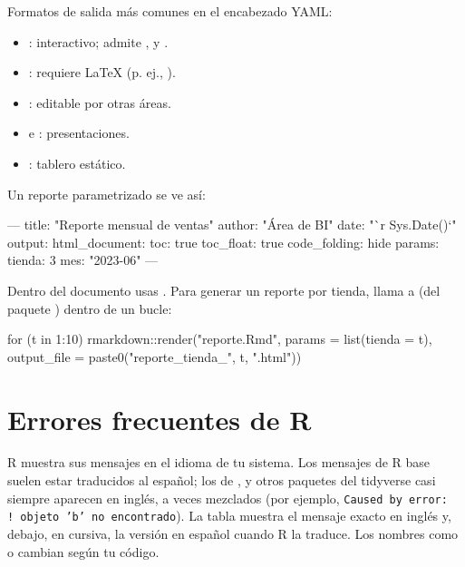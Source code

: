 Formatos de salida más comunes en el encabezado YAML:
\begin{itemize}
\item {}: interactivo; admite ,
   y .
\item {}: requiere LaTeX (p. ej., ).
\item {}: editable por otras áreas.
\item {} e :
  presentaciones.
\item {}: tablero estático.
\end{itemize}
Un reporte parametrizado se ve así:

\begin{textocodigo}[title={Encabezado YAML de un reporte parametrizado}]
---
title: "Reporte mensual de ventas"
author: "Área de BI"
date: "`r Sys.Date()`"
output:
  html_document:
    toc: true
    toc_float: true
    code_folding: hide
params:
  tienda: 3
  mes: "2023-06"
---
\end{textocodigo}

Dentro del documento usas . Para generar un
reporte por tienda, llama a  (del paquete
) dentro de un bucle:

\begin{rnoejecutar}[title={Un reporte por tienda}]
for (t in 1:10) {
  rmarkdown::render("reporte.Rmd", params = list(tienda = t),
                    output_file = paste0("reporte_tienda_", t, ".html"))
}
\end{rnoejecutar}

\section{Errores frecuentes de R}
\label{sec:ap-b-errores}

R muestra sus mensajes en el idioma de tu sistema. Los mensajes de R base
suelen estar traducidos al español; los de ,
 y otros paquetes del tidyverse casi siempre aparecen en
inglés, a veces mezclados (por ejemplo, \texttt{Caused by error: !~objeto
'b' no encontrado}). La tabla muestra el mensaje exacto en inglés y, debajo,
en cursiva, la versión en español cuando R la traduce. Los nombres como
 o  cambian según tu código.

